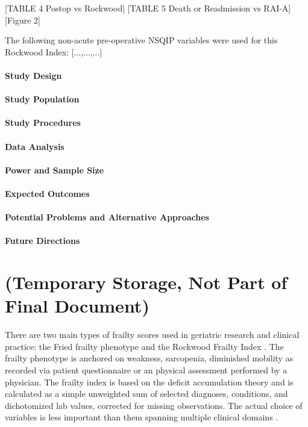 [TABLE 4 Postop vs Rockwood]
[TABLE 5 Death or Readmission vs RAI-A] [Figure 2]

The following non-acute pre-operative NSQIP variables were used for this Rockwood Index: [...,...,...]

\paragraph{Study Design}\label{study-design}


\paragraph{Study Population}\label{study-population}


\paragraph{Study Procedures}\label{study-procedures}


\paragraph{Data Analysis}\label{data-analysis}

\paragraph{Power and Sample Size}\label{power-and-sample-size}

\paragraph{Expected Outcomes}\label{expected-outcomes}

\paragraph{Potential Problems and Alternative
      Approaches}\label{potential-problems-and-alternative-approaches}

\paragraph{Future Directions}\label{future-directions} 
    
\section{(Temporary Storage, Not Part of Final Document)}\label{ammo}
There are two main types of frailty scores used in geriatric research and clinical practice: the Fried frailty phenotype \cite{Fried_2001} and the Rockwood Frailty Index \cite{Mitnitski_2001}. The frailty phenotype is anchored on weakness, sarcopenia, diminished mobility as recorded via patient questionnaire or an physical assessment performed by a physician. The frailty index is based on the deficit accumulation theory and is calculated as a simple unweighted sum of selected diagnoses, conditions, and dichotomized lab values, corrected for missing observations. The actual choice of variables is less important than them spanning multiple clinical domains \cite{Searle_2008}. 

